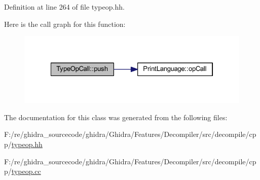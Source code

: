 Definition at line 264 of file typeop.\+hh.

Here is the call graph for this function\+:
\nopagebreak
\begin{figure}[H]
\begin{center}
\leavevmode
\includegraphics[width=322pt]{class_type_op_call_a8597152ff5c82ac28b9b9811cc5b4417_cgraph}
\end{center}
\end{figure}


The documentation for this class was generated from the following files\+:\begin{DoxyCompactItemize}
\item 
F\+:/re/ghidra\+\_\+sourcecode/ghidra/\+Ghidra/\+Features/\+Decompiler/src/decompile/cpp/\mbox{\hyperlink{typeop_8hh}{typeop.\+hh}}\item 
F\+:/re/ghidra\+\_\+sourcecode/ghidra/\+Ghidra/\+Features/\+Decompiler/src/decompile/cpp/\mbox{\hyperlink{typeop_8cc}{typeop.\+cc}}\end{DoxyCompactItemize}

